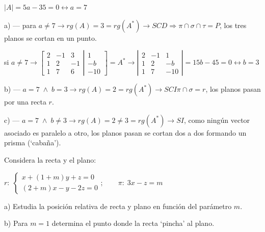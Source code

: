 \begin{proofw}\renewcommand{\qedsymbol}{$\diamond$}
	$|A|=5a-35=0 \leftrightarrow a=7$
	
\noindent a) --- para $a\neq 7 \to rg(A)=3=rg(A^*) \to SCD \Rightarrow \pi\cap \sigma \cap \tau = P$, los tres planos se cortan en un punto.
	
\noindent si $a\neq 7  \to \left[ \begin{matrix} \boxed{2}&\boxed{-1}&3 \\ \boxed{1}&\boxed{2}&-1\\1&7&6 \end{matrix} \right| \left. \begin{matrix} 1\\-b\\-10 \end{matrix} \right]=A^* \to 
\left| \begin{matrix} \boxed{2}&\boxed{-1}&1 \\ \boxed{1}&\boxed{2}&-b\\1&7&-10 \end{matrix} \right|=15b-45=0 \leftrightarrow b=3$

\noindent b) --- $a=7 \;\wedge\; b=3 \to rg(A)=2=rg(A^*)\to SCI \pi\cap\sigma=r$, los planos pasan por una recta $r$.

\noindent c) --- $a=7 \;\wedge\; b\neq3 \to rg(A)=2\neq 3=rg(A^*)\to SI $, como ningún vector asociado es paralelo a otro,  los planos pasan se cortan dos a dos formando un prisma (`cabaña').
\end{proofw}

\begin{ejre}
	Considera la recta y el plano:
	
	$r:\; \begin{cases} x+(1+m)y+z=0\\(2+m)x-y-2z=0 \end{cases}; \qquad \pi:\; 3x-z=m$
	
	a) Estudia la posición relativa de recta y plano en función del parámetro $m$.
	
	b) Para $m=1$ determina el punto donde la recta `pincha' al plano.
\end{ejre}

